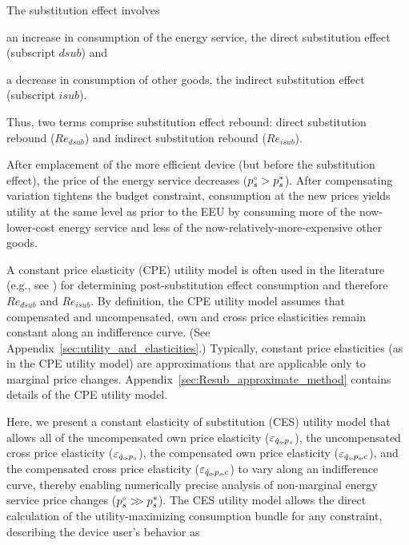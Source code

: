 \documentclass[12pt]{article}\usepackage[]{graphicx}\usepackage[]{xcolor}
\begin{document}
The substitution effect involves
%
\begin{enumerate*}[label={(\roman*)}]

  \item an increase in consumption of the energy service,
        the direct substitution effect (subscript $dsub$) and

  \item a decrease in consumption of other goods,
        the indirect substitution effect (subscript $isub$).

\end{enumerate*}
%
Thus, two terms comprise substitution effect rebound:
direct substitution rebound ($Re_{dsub}$) and
indirect substitution rebound ($Re_{isub}$).

After emplacement of the more efficient device
(but before the substitution effect), 
the price of the energy service decreases (${}{p}^{\scriptscriptstyle \circ}_s > {p}^*_s$).
After compensating variation tightens the budget constraint,
consumption at the new prices yields utility
at the same level as prior to the EEU
by consuming more of the now-lower-cost energy service
and less of the now-relatively-more-expensive other goods.

A constant price elasticity (CPE) utility model
is often used in the literature
(e.g., see \citet[p.~17, footnote~43]{Borenstein:2015aa})
for determining 
post-substitution effect consumption 
and therefore $Re_{dsub}$ and $Re_{isub}$.
By definition, the CPE utility model assumes that 
compensated and uncompensated, own and cross price elasticities
remain constant along an indifference curve. 
(See Appendix~\ref{sec:utility_and_elasticities}.)
Typically,
constant price elasticities (as in the CPE utility model)
are approximations that are applicable only to marginal price changes. 
Appendix~\ref{sec:Resub_approximate_method}
contains details of the CPE utility model.

Here, we present a
constant elasticity of substitution (CES) utility model
that allows all of
the uncompensated own price elasticity ($\varepsilon_{\dot{q}_s\!,p_s}$),
the uncompensated cross price elasticity ($\varepsilon_{\dot{q}_o\!,p_s}$),
the compensated own price elasticity ($\varepsilon_{\dot{q}_s\!,p_s\!,c}$), and
the compensated cross price elasticity ($\varepsilon_{\dot{q}_o\!,p_s\!,c}$)
to vary along an indifference curve, 
thereby enabling numerically precise analysis 
of non-marginal energy service price changes 
(${}{p}^{\scriptscriptstyle \circ}_s >\!\!> {p}^*_s$). 
The CES utility model allows the direct calculation
of the utility-maximizing consumption bundle for any constraint,
describing the device user's behavior as
\end{document}
